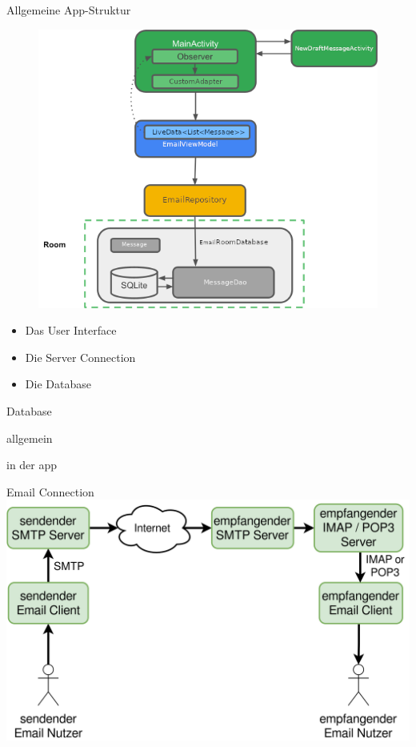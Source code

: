 \documentclass[aspectratio=169]{beamer}
\begin{document}
\begin{frame}{Allgemeine App-Struktur}
\begin{varwidth}{.3\textwidth}
    \pause
        \begin{figure}
            \centering
            \includegraphics[height=.7\textheight]{../maturText/media/AppStructure.png}
        \end{figure}
    \end{varwidth}
    \hfill
    \begin{varwidth}{.5\textwidth}
        \begin{itemize}\pause
            \item Das User Interface \pause
            \item Die Server Connection \pause
            \item Die Database \pause
        \end{itemize}
    \end{varwidth} 
\end{frame}

\begin{frame}{Database}
\begin{block}{allgemein}
\end{block}

\begin{block}{in der app}
\end{block}
\end{frame}

\begin{frame}{Email Connection}
\centering
\includegraphics[width=.8\textwidth]{../maturText/media/connection-diagram.png}
\end{frame}
\end{document}
